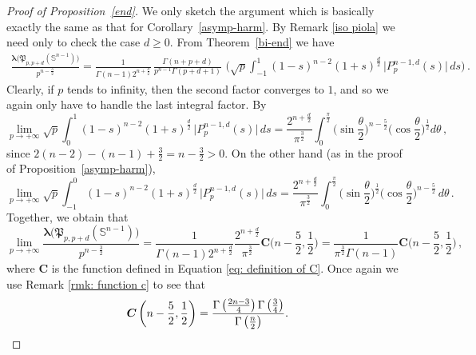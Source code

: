 \documentclass[12pt]{amsart}
\numberwithin{subsection}{section}
\theoremstyle{definition}
\theoremstyle{remark}
\begin{document}
\begin{proof}[Proof of Proposition~\ref{end}] We only sketch the argument which is basically exactly the same as that for  Corollary~\ref{asymp-harm}. By Remark \ref{iso piola} we need only to check the case $d\ge 0.$ From Theorem~\ref{bi-end} we have
\begin{align*}
\frac{\boldsymbol{\lambda}\big(\mathfrak{P}_{p,p+d}(\mathbb{S}^{n-1})\big)}{p^{n-\frac{3}{2}}}
=
\frac{1}{\Gamma(n-1) 2^{n + \frac{d}{2}}}
\,
\frac{\Gamma(n + p + d)}{ p^{n-1} \Gamma(p+d +1)  }
\,\,
\bigg(
  \sqrt{p} \int_{-1}^{1} (1-s)^{n-2} (1+s)^{\frac{d}{2}} \,\big| P_{p}^{n-1,d}(s)\big|\,ds
 \bigg)\,.
  \end{align*}
  Clearly, if  $p $ tends to infinity, then the second factor converges to  $1 $, and so we again only have to handle  the last integral factor. By  \cite[§19, Equation (6), p. 84]{szeg1933Asymptotische}
\[
\lim_{p\to + \infty} \sqrt{p} \int_{0}^{1} (1-s)^{n-2} (1+s)^{\frac{d}{2}} \,\big| P_{p}^{n-1,d}(s)\big|\,ds =
\frac{2^{n+\frac{d}{2}}}{\pi^{\frac{3}{2}}}
\int_{0}^{\frac{\pi}{2}} \big(\sin \frac{\theta}{2}\big)^{n-\frac{5}{2}} \big(\cos \frac{\theta}{2}\big)^{\frac{1}{2}}d\theta\,,
\]
since  $2(n-2) - (n-1) + \frac{3}{2} = n- \frac{3}{2} >0  $. On the other hand (as in the proof of Proposition~\ref{asymp-harm}),
\[
\lim_{p\to + \infty} \sqrt{p} \int_{-1}^{0} (1-s)^{n-2} (1+s)^{\frac{d}{2}} \,\big| P_{p}^{n-1,d}(s)\big|\,ds =
\frac{2^{n+\frac{d}{2}}}{\pi^{\frac{3}{2}}}
\int_{0}^{\frac{\pi}{2}} \big(\sin \frac{\theta}{2}\big)^{\frac{1}{2}}\big(\cos \frac{\theta}{2}\big)^{n-\frac{5}{2}}\,d\theta\,.
\]
Together, we obtain that
\[
\lim_{p \to + \infty}  \frac{\boldsymbol{\lambda}\big(\mathfrak{P}_{p,p+d}(\mathbb{S}^{n-1})\big)}{p^{n- \frac{3}{2}}}
= \frac{1}{\Gamma(n-1) 2^{n + \frac{d}{2}}}  \frac{2^{n+\frac{d}{2}}}{\pi^{\frac{3}{2}}} \boldsymbol{C}\Big(n-\frac{5}{2},\frac{1}{2}\Big)
=
\frac{1}{\pi^{\frac{3}{2}}\Gamma(n-1)} \boldsymbol{C}\Big(n-\frac{5}{2},\frac{1}{2}\Big)\,,
\]
where $\boldsymbol{C}$ is the function defined in Equation \eqref{eq: definition of C}.
Once again we use Remark \ref{rmk: function c} to see that
\[
\boldsymbol{C}\left(n - \frac{5}{2}, \frac{1}{2}\right) = \frac{\Gamma\left(\frac{2n - 3}{4}\right)  \Gamma\left(\frac{3}{4}\right)}{ \Gamma\left(\frac{n}{2}\right)}. \qedhere
\]
\end{proof}




\smallskip
\end{document}
